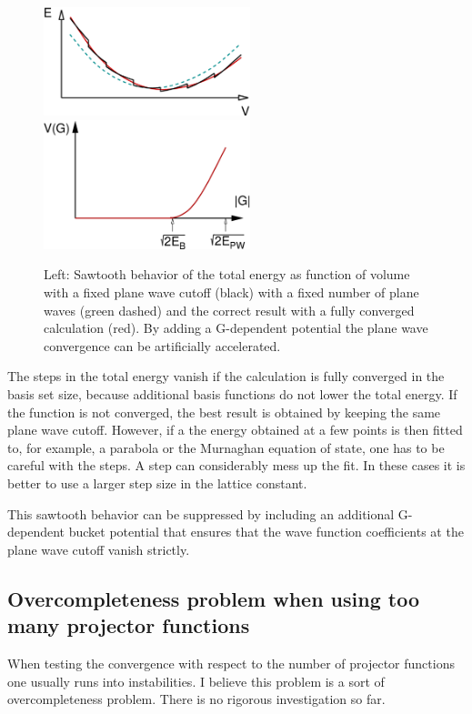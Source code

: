 \documentclass[final,12pt,makeidx,DIV=calc]{article}
\begin{document}
{{{{{{\begin{figure}[h!]
\includegraphics[width=6cm]{Figs/Sawtooth/sawtooth.eps}
\includegraphics[width=6cm]{Figs/Gbucket/gbucket.eps}
\label{fig:sawtooth}
\caption{Left: Sawtooth behavior of the total energy as function of
volume with a fixed plane wave cutoff (black) with a fixed number of
plane waves (green dashed) and the correct result with a fully
converged calculation (red). By adding a G-dependent potential the
plane wave convergence can be artificially accelerated.}
\end{figure}

The steps in the total energy vanish if the calculation is fully converged in
the basis set size, because additional basis functions do not lower the total
energy. If the function is not converged, the best result is obtained by
keeping the same plane wave cutoff. However, if a the energy obtained at a few
points is then fitted to, for example, a parabola or the Murnaghan equation of
state\cite{murnaghan44_pnas30_244}, one has to be careful with the steps. A
step can considerably mess up the fit. In these cases it is better to use a
larger step size in the lattice constant.

This sawtooth behavior can be suppressed by including an additional
G-dependent bucket potential that ensures that the wave function
coefficients at the plane wave cutoff vanish strictly.

\subsection{Overcompleteness problem when using too many projector functions}
When testing the convergence with respect to the number of projector
functions one usually runs into instabilities. I believe this problem
is a sort of overcompleteness problem. There is no rigorous
investigation so far.

}}}}}}
\end{document}
